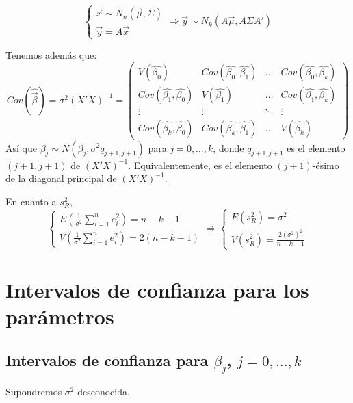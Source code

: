 \begin{note}
    $$\begin{cases}
            \vec{x} \sim N_n(\vec{\mu}, \Sigma) \\
            \vec{y} = A\vec{x}
        \end{cases} \Rightarrow \vec{y} \sim N_k(A\vec{\mu}, A\Sigma A')$$
\end{note}

Tenemos además que:
$$Cov(\hat{\vec{\beta}}) = \sigma^2(X'X)^{-1} = \begin{pmatrix}
        V(\hat{\beta_0})                  & Cov(\hat{\beta_0}, \hat{\beta_1}) & \dots  & Cov(\hat{\beta_0}, \hat{\beta_k}) \\
        Cov(\hat{\beta_1}, \hat{\beta_0}) & V(\hat{\beta_1})                  & \dots  & Cov(\hat{\beta_1}, \hat{\beta_k}) \\
        \vdots                            & \vdots                            & \ddots & \vdots                            \\
        Cov(\hat{\beta_k}, \hat{\beta_0}) & Cov(\hat{\beta_k}, \hat{\beta_1}) & \dots  & V(\hat{\beta_k})
    \end{pmatrix}$$
Así que $\hat{\beta_j} \sim N(\beta_j, \sigma^2 q_{j+1, j+1})$ para $j = 0, \dots, k$, donde $q_{j+1, j+1}$ es el elemento $(j+1, j+1)$ de $(X'X)^{-1}$.
Equivalentemente, es el elemento $(j+1)$-ésimo de la diagonal principal de $(X'X)^{-1}$.

En cuanto a $s_R^2$,
$$\begin{cases}
        E(\frac{1}{\sigma^2} \sum_{i=1}^n e_i^2) = n-k-1 \\
        V(\frac{1}{\sigma^2} \sum_{i=1}^n e_i^2) = 2(n-k-1)
    \end{cases} \Rightarrow \begin{cases}
        E(s_R^2) = \sigma^2 \\
        V(s_R^2) = \frac{2(\sigma^2)^2}{n-k-1}
    \end{cases}$$

\section{Intervalos de confianza para los parámetros}
\subsection*{Intervalos de confianza para $\beta_j$, $j = 0, \dots, k$}
Supondremos $\sigma^2$ desconocida.

